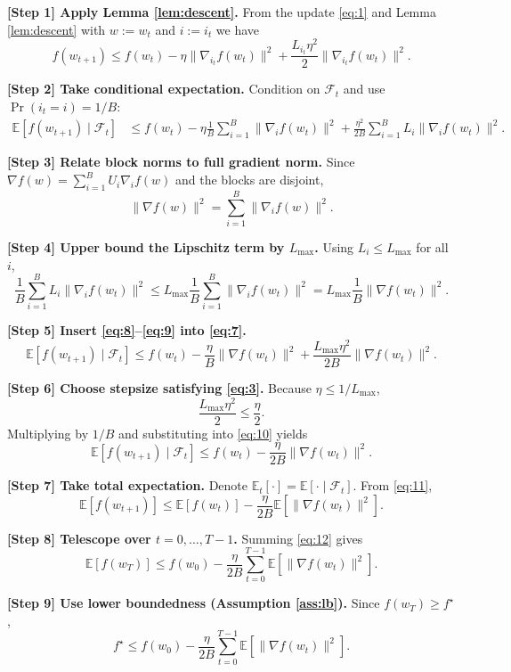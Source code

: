 \documentclass{article}
\newcommand{\E}{\mathbb{E}}
\begin{document}
\bigskip
\noindent\textbf{[Step 1] Apply Lemma \ref{lem:descent}.}  
From the update \eqref{eq:1} and Lemma \ref{lem:descent} with $w:=w_t$ and $i:=i_t$ we have
\[
f(w_{t+1})\le f(w_t)-\eta\|\nabla_{i_t}f(w_t)\|^2
+\frac{L_{i_t}\eta^2}{2}\|\nabla_{i_t}f(w_t)\|^2 .
\tag{6}
\]

\noindent\textbf{[Step 2] Take conditional expectation.}  
Condition on $\mathcal{F}_t$ and use $\Pr(i_t=i)=1/B$:
\[
\begin{aligned}
\E\!\left[f(w_{t+1})\mid\mathcal{F}_t\right]
&\le f(w_t)-\eta\frac{1}{B}\sum_{i=1}^{B}\|\nabla_i f(w_t)\|^2
+\frac{\eta^2}{2B}\sum_{i=1}^{B}L_i\|\nabla_i f(w_t)\|^2 .
\end{aligned}
\tag{7}
\]

\noindent\textbf{[Step 3] Relate block norms to full gradient norm.}  
Since $\nabla f(w)=\sum_{i=1}^{B}U_i\nabla_i f(w)$ and the blocks are disjoint,
\[
\|\nabla f(w)\|^2=\sum_{i=1}^{B}\|\nabla_i f(w)\|^2 .
\tag{8}
\]

\noindent\textbf{[Step 4] Upper bound the Lipschitz term by $L_{\max}$.}  
Using $L_i\le L_{\max}$ for all $i$,
\[
\frac{1}{B}\sum_{i=1}^{B}L_i\|\nabla_i f(w_t)\|^2
\le L_{\max}\frac{1}{B}\sum_{i=1}^{B}\|\nabla_i f(w_t)\|^2
= L_{\max}\frac{1}{B}\|\nabla f(w_t)\|^2 .
\tag{9}
\]

\noindent\textbf{[Step 5] Insert \eqref{eq:8}–\eqref{eq:9} into \eqref{eq:7}.}  
\[
\E\!\left[f(w_{t+1})\mid\mathcal{F}_t\right]
\le f(w_t)-\frac{\eta}{B}\|\nabla f(w_t)\|^2
+\frac{L_{\max}\eta^2}{2B}\|\nabla f(w_t)\|^2 .
\tag{10}
\]

\noindent\textbf{[Step 6] Choose stepsize satisfying \eqref{eq:3}.}  
Because $\eta\le 1/L_{\max}$,
\[
\frac{L_{\max}\eta^2}{2}\le \frac{\eta}{2}.
\]
Multiplying by $1/B$ and substituting into \eqref{eq:10} yields
\[
\E\!\left[f(w_{t+1})\mid\mathcal{F}_t\right]
\le f(w_t)-\frac{\eta}{2B}\|\nabla f(w_t)\|^2 .
\tag{11}
\]

\noindent\textbf{[Step 7] Take total expectation.}  
Denote $\E_t[\cdot]=\E[\cdot\mid\mathcal{F}_t]$.  From \eqref{eq:11},
\[
\E\!\left[f(w_{t+1})\right]\le \E\!\left[f(w_t)\right]
-\frac{\eta}{2B}\E\!\left[\|\nabla f(w_t)\|^2\right].
\tag{12}
\]

\noindent\textbf{[Step 8] Telescope over $t=0,\dots ,T-1$.}
Summing \eqref{eq:12} gives
\[
\E\!\left[f(w_T)\right]\le f(w_0)-\frac{\eta}{2B}
\sum_{t=0}^{T-1}\E\!\left[\|\nabla f(w_t)\|^2\right].
\tag{13}
\]

\noindent\textbf{[Step 9] Use lower boundedness (Assumption \ref{ass:lb}).}
Since $f(w_T)\ge f^\star$,
\[
f^\star \le f(w_0)-\frac{\eta}{2B}
\sum_{t=0}^{T-1}\E\!\left[\|\nabla f(w_t)\|^2\right].
\tag{14}
\]
\end{document}
